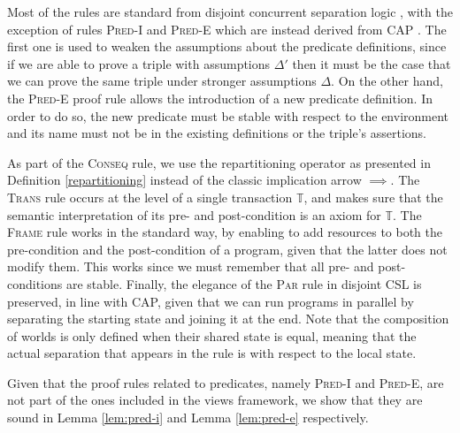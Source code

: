 Most of the rules are standard from disjoint concurrent separation logic \cite{csl}, with the exception of rules \textsc{Pred-I} and \textsc{Pred-E} which are instead derived from CAP \cite{cap}. The first one is used to weaken the assumptions about the predicate definitions, since if we are able to prove a triple with assumptions $\Delta'$ then it must be the case that we can prove the same triple under stronger assumptions $\Delta$. On the other hand, the \textsc{Pred-E} proof rule allows the introduction of a new predicate definition. In order to do so, the new predicate must be stable with respect to the environment and its name must not be in the existing definitions or the triple's assertions.

As part of the \textsc{Conseq} rule, we use the repartitioning operator as presented in Definition \ref{repartitioning} instead of the classic implication arrow $\implies$. The \textsc{Trans} rule occurs at the level of a single transaction $\mathds{T}$, and makes sure that the semantic interpretation of its pre- and post-condition is an axiom for $\mathds{T}$. The \textsc{Frame} rule works in the standard way, by enabling to add resources to both the pre-condition and the post-condition of a program, given that the latter does not modify them. This works since we must remember that all pre- and post-conditions are stable. Finally, the elegance of the \textsc{Par} rule in disjoint CSL is preserved, in line with CAP, given that we can run programs in parallel by separating the starting state and joining it at the end. Note that the composition of worlds is only defined when their shared state is equal, meaning that the actual separation that appears in the rule is with respect to the local state.

Given that the proof rules related to predicates, namely \textsc{Pred-I} and \textsc{Pred-E}, are not part of the ones included in the views framework, we show that they are sound in Lemma \ref{lem:pred-i} and Lemma \ref{lem:pred-e} respectively.
